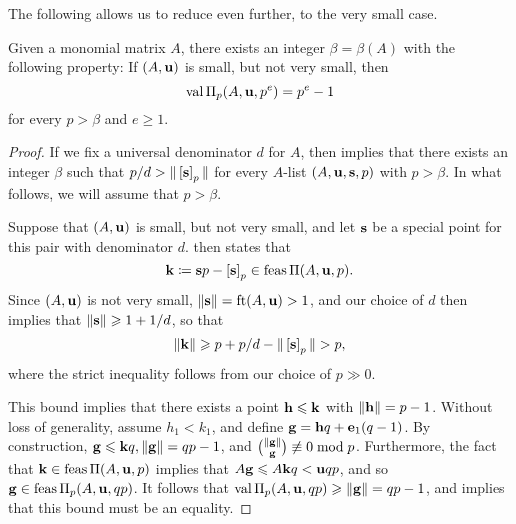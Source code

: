 \documentclass[11pt]{amsart}
\newcommand{\denom}{d}
\begin{document}
The following allows us to reduce even further, to the very small case.

\begin{theorem}
   \label{small not very small value: T}
   Given a monomial matrix $A$, there exists an integer $\beta=\beta(A)$ with the following property\textup:
   If $(A, \mathbf{u})$ is small, but not very small, then  \[ \operatorname{val} \Pi_p(A, \mathbf{u}, p^e) = p^e-1\] for every $p > \beta$ and $e \geq 1$.
\end{theorem}

\begin{proof}
   If we fix a universal denominator $\denom$ for $A$, then  implies that there exists an integer $\beta$ such that $p/\denom > \norm{\tail{\vv{s}}_p}$ for every $A$-list $(A,\mathbf{u},\mathbf{s}, p)$ with $p > \beta$.
   In what follows, we will assume that $p > \beta$.

   Suppose that $(A,\mathbf{u})$ is small, but not very small, and let $\mathbf{s}$ be a special point for this pair with denominator $\denom$.
    then states that
   \[ \mathbf{k} \coloneqq \mathbf{s}p-\left[ \mathbf{s} \right]_p \in \operatorname{feas} \Pi(A,\mathbf{u},p). \]
   Since $(A,\mathbf{u})$ is not very small, $\| \mathbf{s} \| = \operatorname{ft}(A, \mathbf{u}) > 1$, and our choice of $\denom$ then implies that $\norm{\vv{s}} \geq 1 + 1/\denom$, so that
   \[\norm{\vv{k}} \geq p + p/\denom - \norm{\tail{\vv{s}}_p} > p,\]
   where the strict inequality follows from our choice of $p \gg 0$.

   This bound implies that there exists a point $\mathbf{h} \leqslant \mathbf{k}$ with $\| \mathbf{h} \| = p-1$.
   Without loss of generality, assume $h_1 < k_1$, and define $\mathbf{g} = \mathbf{h}q + \mathbf{e}_1(q-1)$.
   By construction, $\mathbf{g} \leqslant \mathbf{k}q, \| \mathbf{g} \| = qp-1$, and $\binom{\| \mathbf{g} \|}{\mathbf{g}} \not\equiv 0 \bmod p$.
   Furthermore, the fact that $\mathbf{k} \in \operatorname{feas} \Pi(A,\mathbf{u},p)$ implies that $A\mathbf{g} \leqslant A{\mathbf{k}}q < \mathbf{u}qp$, and so $\mathbf{g} \in \operatorname{feas} \Pi_p(A,\mathbf{u},qp)$.
   It follows that $\operatorname{val} \Pi_p(A,\mathbf{u},qp) \geqslant \| \mathbf{g} \| = qp-1$, and  implies that this bound must be an equality.
\end{proof} 
\end{document}
